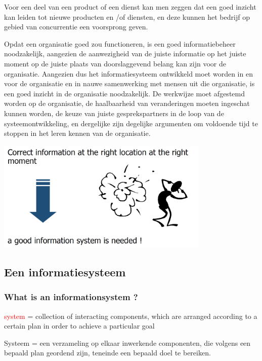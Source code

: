 Voor een deel van een product of een dienst kan men zeggen dat een goed inzicht kan leiden tot nieuwe producten en /of diensten, en deze kunnen het bedrijf op gebied van concurrentie een voorsprong geven.

\newpage

Opdat een organisatie goed zou functioneren, is een goed informatiebeheer noodzakelijk, aangezien de aanwezigheid van de juiste informatie op het juiste moment op de juiste plaats van doorslaggevend belang kan zijn voor de organisatie. Aangezien dus het informatiesysteem ontwikkeld moet worden in en voor de organisatie en in nauwe samenwerking met mensen uit die organisatie, is een goed inzicht in de organisatie noodzakelijk. De werkwijze moet afgestemd worden op de organisatie, de haalbaarheid van veranderingen moeten ingeschat kunnen worden, de keuze van juiste gesprekspartners in de loop van de systeemontwikkeling, en dergelijke zijn degelijke argumenten om voldoende tijd te stoppen in het leren kennen van de organisatie.

\begin{center}
\includegraphics[width=4in]{img/theimportanceofinformation2}%
\end{center}

\subsection{Een informatiesysteem}

\subsubsection{What is an \Gls{informationsystem} ?}

\textcolor{red}{\Gls{system}} = collection of interacting components, which are arranged according to a certain plan in order to achieve a particular goal

Systeem = een verzameling op elkaar inwerkende componenten, die volgens een bepaald plan geordend zijn, teneinde een bepaald doel te bereiken.

